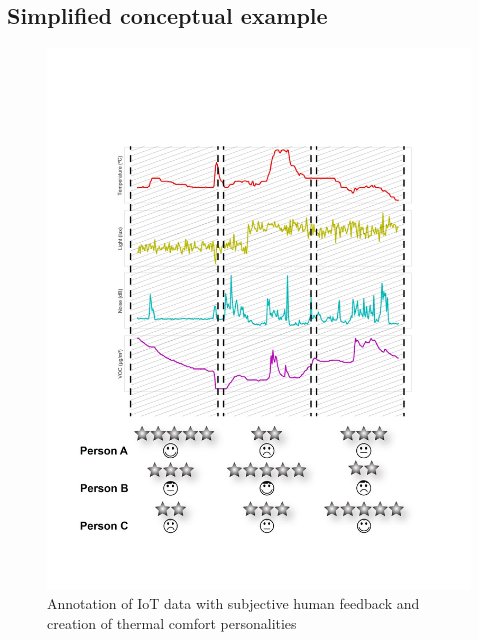 \documentclass[]{interact}
\theoremstyle{plain}%
\theoremstyle{definition}
\theoremstyle{remark}
\begin{document}
\subsection{Simplified conceptual example}
\begin{figure}
\centering
\includegraphics[scale=0.3]{figures/ieq_iot_annotated.jpg}
\caption{Annotation of IoT data with subjective human feedback and creation of thermal comfort personalities} \label{iot-example-annotated}
\end{figure}
\end{document}
